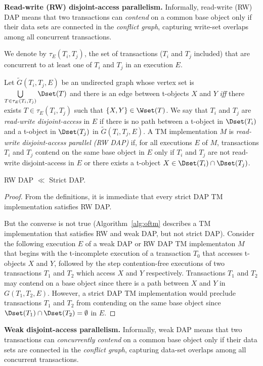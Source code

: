 \vspace{1mm}\noindent\textbf{Read-write (RW) disjoint-access parallelism.}
Informally, read-write (RW) DAP means that two transactions
can \emph{contend}  
on a common base object only if their data 
sets are connected in the \emph{conflict graph}, capturing 
write-set overlaps among all concurrent transactions.

We denote by $\tau_{E}(T_i,T_j)$, the set of transactions ($T_i$ and $T_j$ included)
that are concurrent to at least one of $T_i$ and $T_j$ in an execution $E$.

Let ${\tilde G}(T_i,T_j,E)$ be an undirected graph whose vertex set is $\bigcup\limits_{T \in \tau_{E}(T_i,T_j)} \Dset(T)$
and there is an edge
between t-objects $X$ and $Y$ \emph{iff} there exists $T \in \tau_{E}(T_i,T_j)$ such that 
$\{X,Y\} \in \Wset(T)$.
We say that $T_i$ and $T_j$ are \emph{read-write disjoint-access} in $E$
if there is no path between a t-object in $\Dset(T_i)$ and a t-object in $\Dset(T_j)$ in ${\tilde G}(T_i,T_j,E)$.
A TM implementation $M$ is \emph{read-write disjoint-access parallel (RW DAP)} if, for
all executions $E$ of $M$, 
transactions $T_i$ and $T_j$ 
contend on the same base object in $E$ only if   
$T_i$ and $T_j$ are not read-write disjoint-access in $E$ or there exists a t-object $X \in \Dset(T_i) \cap \Dset(T_j)$.
\begin{proposition}
RW DAP $\ll$ Strict DAP.
\end{proposition}
\begin{proof}
From the definitions, it is immediate that every strict DAP TM implementation satisfies RW DAP.

But the converse is not true (Algorithm~\ref{alg:oftm} describes a TM implementation that satisfies RW and weak DAP, but not strict DAP).
Consider the following execution $E$ of a weak DAP or RW DAP TM implementaton $M$ 
that begins with the t-incomplete execution of a transaction $T_0$ that 
accesses t-objects $X$ and $Y$, followed by the step contention-free executions of two transactions $T_1$ and $T_2$ 
which access $X$ and $Y$ respectively. Transactions $T_1$ and $T_2$ may contend on a base object since 
there is a path between $X$ and $Y$ in $G(T_1,T_2,E)$. However, a strict DAP TM implementation
would preclude transactions $T_1$ and $T_2$ from contending on the same base object since $\Dset(T_1) \cap \Dset(T_2)=\emptyset$
in $E$.
\end{proof}
\vspace{1mm}\noindent\textbf{Weak disjoint-access parallelism.}
Informally, weak DAP means that two transactions
can \emph{concurrently contend}  
on a common base object only if their data 
sets are connected in the \emph{conflict graph}, capturing 
data-set overlaps among all concurrent transactions.

